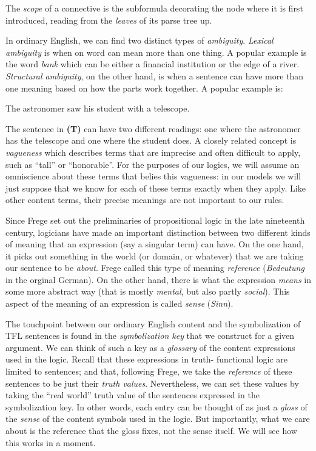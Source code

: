\begin{definition}
  The \emph{scope} of a connective is the subformula decorating the node where
  it is first introduced, reading from the \emph{leaves} of its parse tree up.
\end{definition}

In ordinary English, we can find two distinct types of \emph{ambiguity}.
\emph{Lexical ambiguity} is when on word can mean more than one thing. A popular
example is the word \emph{bank} which can be either a financial institution or
the edge of a river. \emph{Structural ambiguity}, on the other hand, is when a
sentence can have more than one meaning based on how the parts work together. A
popular example is:

\begin{argument}
\item[\textbf{(T)}] The astronomer saw his student with a telescope.
\end{argument}

The sentence in \textbf{(T)} can have two different readings: one where the
astronomer has the telescope and one where the student does. A closely related
concept is \emph{vagueness} which describes terms that are imprecise and often
difficult to apply, such as ``tall'' or ``honorable''. For the purposes of our
logics, we will assume an omniscience about these terms that belies this
vagueness: in our models we will just suppose that we know for each of these
terms exactly when they apply. Like other content terms, their precise meanings
are not important to our rules.

Since Frege set out the preliminaries of propositional logic
in the late nineteenth century, logicians have made an important distinction
between two different kinds of meaning that an expression (say a singular term)
can have. On the one hand, it picks out something in the world (or domain, or
whatever) that we are taking our sentence to be \emph{about}. Frege called this
type of meaning \emph{reference} (\emph{Bedeutung} in the orginal German). On
the other hand, there is what the expression \emph{means} in some more abstract
way (that is mostly \emph{mental}, but also partly \emph{social}). This aspect
of the meaning of an expression is called \emph{sense} (\emph{Sinn}).

The touchpoint between our ordinary English content and the symbolization of
TFL sentences is found in the \emph{symbolization key} that we construct for
a given argument. We can think of such a key as a \emph{glossary} of the
content expressions used in the logic. Recall that these expressions in truth-
functional logic are limited to sentences; and that, following Frege, we take
the \emph{reference} of these sentences to be just their \emph{truth values}.
Nevertheless, we can set these values by taking the ``real world'' truth value
of the sentences expressed in the symbolization key. In other words, each entry
can be thought of as just a \emph{gloss} of the \emph{sense} of the content
symbols used in the logic. But importantly, what we care about is the reference
that the gloss fixes, not the sense itself. We will see how this works in a
moment.

